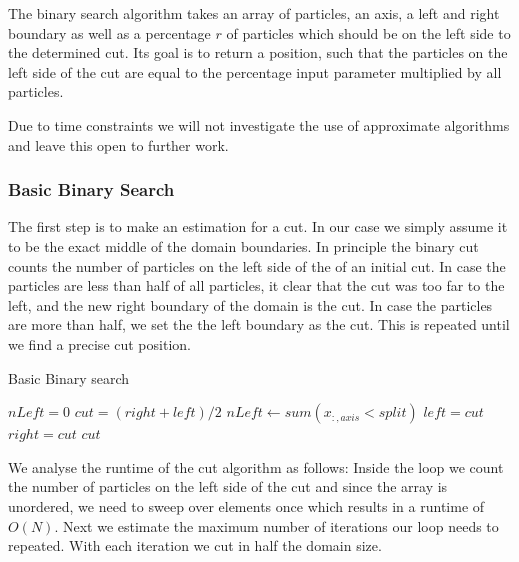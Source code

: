\documentclass[]{article}
\begin{document}
 The binary search algorithm takes an array of particles, an axis, a left and right boundary as well as a percentage $r$ of particles which should be on the left side to the determined cut. Its goal is to return a position, such that the particles on the left side of the cut are equal to the percentage input parameter multiplied by all particles.
 
 Due to time constraints we will not investigate the use of approximate algorithms and leave this open to further work.

\subsubsection{Basic Binary Search}

The first step is to make an estimation for a cut. In our case we simply assume it to be the exact middle of the domain boundaries. In principle the binary cut counts the number of particles on the left side of the of an initial cut. In case the particles are less than half of all particles, it clear that the cut was too far to the left, and the new right boundary of the domain is the cut. In case the particles are more than half, we set the the left boundary as the cut. This is repeated until we find a precise cut position.




\begin{algorithm}[H]
	\caption{Basic Binary search}\label{algo:cut}
	\begin{algorithmic}[1]
		\State $nLeft = 0$
		\newline
		\State $cut = (right + left ) / 2 $
		\State $nLeft\gets sum(x_{:,axis} < split)$
		\newline
		\State $left = cut$
		\Else 
		\State $right = cut$
		\EndIf
		\newline
		\EndWhile\label{euclidendwhile}
		\State \Return $cut$
		\EndProcedure
	\end{algorithmic}
\end{algorithm}

We analyse the runtime of the cut algorithm as follows: Inside the loop we count the number of particles on the left side of the cut and since the array is unordered, we need to sweep over elements once which results in a runtime of $O(N)$. Next we estimate the maximum number of iterations our loop needs to repeated. With each iteration we cut in half the domain size.  
\end{document}
